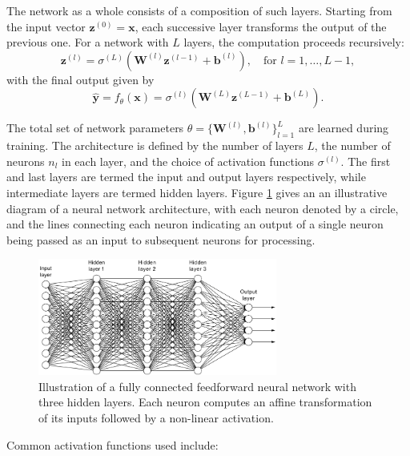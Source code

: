 The network as a whole consists of a composition of such layers. Starting from the input 
vector \( \mathbf{z}^{(0)} = \mathbf{x} \), each successive layer transforms the output of the previous
one. For a network with \( L \) layers, the computation proceeds recursively:
\[
    \mathbf{z}^{(l)} = \sigma^{(L)}\left( \mathbf{W}^{(l)} \mathbf{z}^{(l-1)} + \mathbf{b}^{(l)} 
    \right), \quad \text{for } l = 1, \dots, L-1,
\]
with the final output given by
\[
    \hat{\mathbf{y}} = f_\theta(\mathbf{x}) = \sigma^{(l)}(\mathbf{W}^{(L)} \mathbf{z}^{(L-1)} + 
    \mathbf{b}^{(L)}).
\]

The total set of network parameters \( \theta = \{ \mathbf{W}^{(l)}, \mathbf{b}^{(l)} \}_{l=1}^L \) 
are learned during training. The architecture is defined by the number of layers \( L \), the number 
of neurons \( n_l \) in each layer, and the choice of activation functions \( \sigma^{(l)} \).
The first and last layers are termed the input and output layers respectively, while intermediate 
layers are termed hidden layers. Figure \ref{fig:nn-architecture} gives an an illustrative diagram of 
a neural network architecture, with each neuron denoted by a circle, and the lines connecting each
neuron indicating an output of a single neuron being passed as an input to subsequent neurons for 
processing.

\begin{figure}[h]
    \centering
    \includegraphics[width=0.7\textwidth]{graphics/neural_network_image.png}
    \caption{Illustration of a fully connected feedforward neural network with three hidden layers. 
    Each neuron computes an affine transformation of its inputs followed by a non-linear activation.}
    \label{fig:nn-architecture}
\end{figure}


Common activation functions used include:

